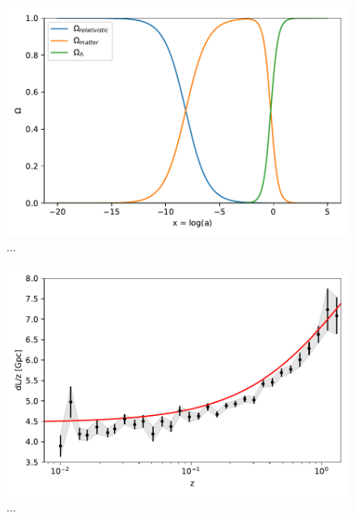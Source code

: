 \documentclass{aa}
\begin{document}
\begin{figure}[h!]
   \includegraphics[scale=0.5]{Figures/M1_densities.pdf}
   \caption{...}\label{fig:M1_densities}
\end{figure}

\begin{figure}[h!]
   \includegraphics[scale=0.5]{Figures/M1_supernova.pdf}
   \caption{...}\label{fig:M1_supernova}
\end{figure}
\end{document}
